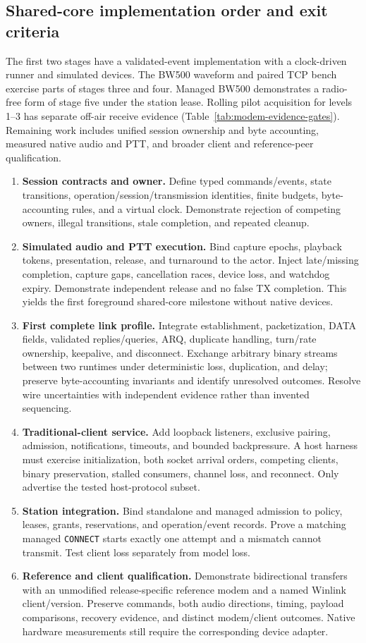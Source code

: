 \subsection{Shared-core implementation order and exit criteria}
\label{sec:modem-core-plan}
The first two stages have a validated-event implementation with a
clock-driven runner and simulated devices. The BW500 waveform and paired
TCP bench exercise parts of stages three and four. Managed BW500
demonstrates a radio-free form of stage five under the station lease.
Rolling pilot acquisition for levels 1--3 has separate off-air receive
evidence (Table~\ref{tab:modem-evidence-gates}). Remaining work includes
unified session ownership and byte accounting, measured native audio and
PTT, and broader client and reference-peer qualification.
\begin{enumerate}
\item \textbf{Session contracts and owner.} Define typed commands/events,
state transitions, operation/session/transmission identities, finite budgets,
byte-accounting rules, and a virtual clock. Demonstrate rejection of competing
owners, illegal transitions, stale completion, and repeated cleanup.
\item \textbf{Simulated audio and PTT execution.} Bind capture epochs,
playback tokens, presentation, release, and turnaround to the actor. Inject
late/missing completion, capture gaps, cancellation races, device loss, and
watchdog expiry. Demonstrate independent release and no false TX completion.
This yields the first foreground shared-core milestone without native devices.
\item \textbf{First complete link profile.} Integrate establishment,
packetization, DATA fields, validated replies/queries, ARQ, duplicate handling,
turn/rate ownership, keepalive, and disconnect. Exchange arbitrary binary
streams between two runtimes under deterministic loss, duplication, and delay;
preserve byte-accounting invariants and identify unresolved outcomes. Resolve
wire uncertainties with independent evidence rather than invented sequencing.
\item \textbf{Traditional-client service.} Add loopback listeners, exclusive
pairing, admission, notifications, timeouts, and bounded backpressure. A host
harness must exercise initialization, both socket arrival orders, competing
clients, binary preservation, stalled consumers, channel loss, and reconnect.
Only advertise the tested host-protocol subset.
\item \textbf{Station integration.} Bind standalone and managed admission to
policy, leases, grants, reservations, and operation/event records. Prove a
matching managed \texttt{CONNECT} starts exactly one attempt and a mismatch
cannot transmit. Test client loss separately from model loss.
\item \textbf{Reference and client qualification.} Demonstrate bidirectional
transfers with an unmodified release-specific reference modem and a named
Winlink client/version. Preserve commands, both audio directions, timing,
payload comparisons, recovery evidence, and distinct modem/client outcomes.
Native hardware measurements still require the corresponding device adapter.
\end{enumerate}

